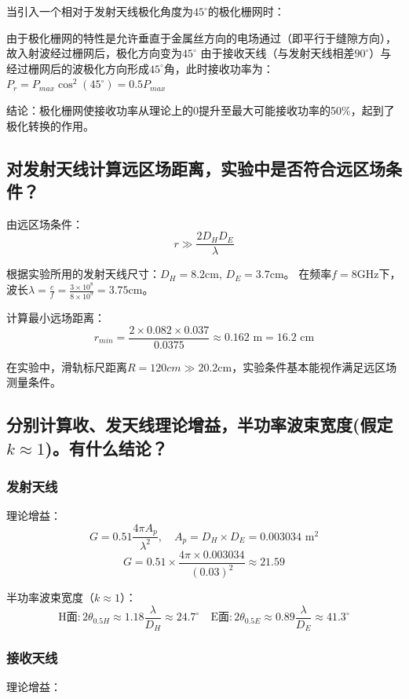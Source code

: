 \documentclass[12pt,a4paper,UTF8]{article}
\begin{document}
当引入一个相对于发射天线极化角度为$45^\circ$的极化栅网时：

由于极化栅网的特性是允许垂直于金属丝方向的电场通过（即平行于缝隙方向），故入射波经过栅网后，极化方向变为$45^\circ$
由于接收天线（与发射天线相差$90^\circ$）与经过栅网后的波极化方向形成$45^\circ$角，此时接收功率为：$P_r = P_{max}\cos^2(45^\circ) = 0.5P_{max}$

结论：极化栅网使接收功率从理论上的0提升至最大可能接收功率的50\%，起到了极化转换的作用。

\subsection{对发射天线计算远区场距离，实验中是否符合远区场条件？}

由远区场条件：
\[
r \gg \frac{2D_HD_E}{\lambda}
\]

根据实验所用的发射天线尺寸：$D_H = 8.2\text{cm}$, $D_E = 3.7\text{cm}$。
在频率$f = 8\text{GHz}$下，波长$\lambda = \frac{c}{f} = \frac{3\times10^8}{8\times10^9} = 3.75\text{cm}$。

计算最小远场距离：
\[
r_{min} = \frac{2 \times 0.082 \times 0.037}{0.0375} \approx 0.162\text{ m} = 16.2\text{ cm}
\]

在实验中，滑轨标尺距离$R = 120cm \gg 20.2\text{cm}$，实验条件基本能视作满足远区场测量条件。

\subsection{分别计算收、发天线理论增益，半功率波束宽度(假定$k\approx1$)。有什么结论？}

\subsubsection{发射天线}

理论增益：
\[
G = 0.51 \frac{4\pi A_p}{\lambda^2}, \quad A_p = D_H \times D_E = 0.003034\text{ m}^2
\]
\[
G = 0.51 \times \frac{4\pi \times 0.003034}{(0.03)^2} \approx 21.59
\]

半功率波束宽度（$k \approx 1$）：
\[
\text{H面}: 2\theta_{0.5H} \approx 1.18\frac{\lambda}{D_H} \approx 24.7^\circ
\quad \text{E面}: 2\theta_{0.5E} \approx 0.89\frac{\lambda}{D_E} \approx 41.3^\circ
\]

\subsubsection{接收天线}
理论增益：
\end{document}

